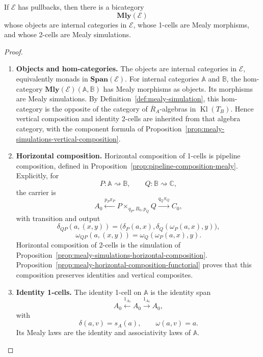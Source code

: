 \begin{theorem}
\label{thm:mealy-bicategory}
    If \(\mathcal E\) has pullbacks, then there is a bicategory
    \[
        \mathbf{Mly}(\mathcal E)
    \]
    whose objects are internal categories in \(\mathcal E\), whose 1-cells are Mealy morphisms, and whose 2-cells are Mealy simulations.
\end{theorem}
\begin{proof}
    \leavevmode
    \begin{enumerate}
        \item \textbf{Objects and hom-categories.} The objects are internal categories in \(\mathcal E\), equivalently monads in \(\mathbf{Span}(\mathcal E)\). For internal categories \(\mathbb A\) and \(\mathbb B\), the hom-category \(\mathbf{Mly}(\mathcal E)(\mathbb A,\mathbb B)\) has Mealy morphisms as objects. Its morphisms are Mealy simulations. By Definition~\ref{def:mealy-simulation}, this hom-category is the opposite of the category of \(\overline R_A\)-algebras in \(\operatorname{Kl}(T_B)\). Hence vertical composition and identity 2-cells are inherited from that algebra category, with the component formula of Proposition~\ref{prop:mealy-simulations-vertical-composition}.

        \item \textbf{Horizontal composition.} Horizontal composition of 1-cells is pipeline composition, defined in Proposition~\ref{prop:pipeline-composition-mealy}. Explicitly, for
        \[
            P:\mathbb A\rightsquigarrow\mathbb B,
            \qquad
            Q:\mathbb B\rightsquigarrow\mathbb C,
        \]
        the carrier is
        \[
            A_0
            \xleftarrow{p_P\pi_P}
            P\times_{q_P,B_0,p_Q}Q
            \xrightarrow{q_Q\pi_Q}
            C_0,
        \]
        with transition and output
        \[
            \delta_{QP}(a,(x,y))
            =
            \bigl(\delta_P(a,x),\delta_Q(\omega_P(a,x),y)\bigr),
        \]
        \[
            \omega_{QP}(a,(x,y))
            =
            \omega_Q(\omega_P(a,x),y).
        \]
        Horizontal composition of 2-cells is the simulation of Proposition~\ref{prop:mealy-simulations-horizontal-composition}. Proposition~\ref{prop:mealy-horizontal-composition-functorial} proves that this composition preserves identities and vertical composites.

        \item \textbf{Identity 1-cells.} The identity 1-cell on \(\mathbb A\) is the identity span
        \[
            A_0\xleftarrow{1_{A_0}}A_0\xrightarrow{1_{A_0}}A_0,
        \]
        with
        \[
            \delta(a,v)=s_A(a),
            \qquad
            \omega(a,v)=a.
        \]
        Its Mealy laws are the identity and associativity laws of
        \(\mathbb A\).


\end{enumerate}
\end{proof}
